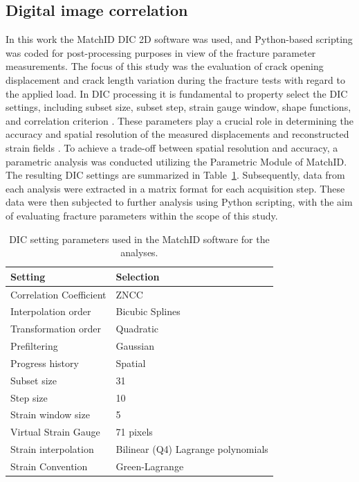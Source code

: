 \documentclass[3p,times,procedia]{elsarticle}
\begin{document}
\subsection{Digital image correlation}\label{Ss:dic}

In this work the MatchID DIC 2D software was used, and Python-based scripting was coded for post-processing purposes in view of the fracture parameter measurements. The focus of this study was the evaluation of crack opening displacement and crack length variation during the fracture tests with regard to the applied load. In DIC processing it is fundamental to property select the DIC settings, including subset size, subset step, strain gauge window, shape functions, and correlation criterion \citep{DICguide2018}. These parameters play a crucial role in determining the accuracy and spatial resolution of the measured displacements and reconstructed strain fields \citep{Xavier2012207,PereiraandXavier2018, ma15020625}. To achieve a trade-off between spatial resolution and accuracy, a parametric analysis was conducted utilizing the Parametric Module of MatchID. The resulting DIC settings are summarized in Table~\ref{tab:MatchID_param}. Subsequently, data from each analysis were extracted in a matrix format for each acquisition step. These data were then subjected to further analysis using Python scripting, with the aim of evaluating fracture parameters within the scope of this study.

\begin{table}[h]
	\centering
	\begin{tabular}{m{} m{}}
		\toprule
		\textbf{Setting} & \textbf{Selection} \\
		\midrule
		Correlation Coefficient & ZNCC \\
		Interpolation order & Bicubic Splines \\ 
		Transformation order & Quadratic \\
		Prefiltering & Gaussian \\
		Progress history & Spatial \\
		Subset size & 31 \\
		Step size & 10 \\
		Strain window size & 5 \\ 
		Virtual Strain Gauge & 71 pixels \\
		Strain interpolation & Bilinear (Q4) Lagrange polynomials \\
		Strain Convention & Green-Lagrange \\\bottomrule
	\end{tabular}
	\caption{DIC setting parameters used in the MatchID software for the analyses.}
	\label{tab:MatchID_param}
\end{table}
\end{document}
